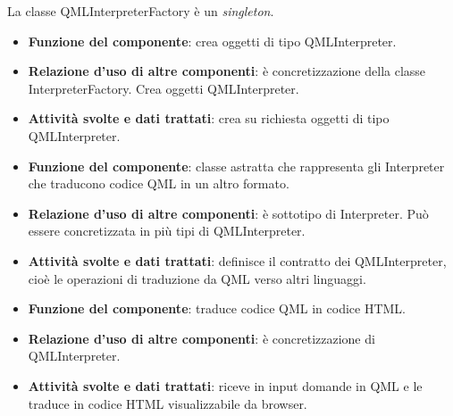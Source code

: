 La classe QMLInterpreterFactory è un \emph{singleton}.
\begin{itemize}
	\item\textbf{Funzione del componente}: crea oggetti di tipo QMLInterpreter.
	\item\textbf{Relazione d'uso di altre componenti}: è concretizzazione della classe InterpreterFactory. Crea oggetti QMLInterpreter.
	\item\textbf{Attività svolte e dati trattati}: crea su richiesta oggetti di tipo QMLInterpreter.
\end{itemize}
\begin{itemize}
	\item\textbf{Funzione del componente}: classe astratta che rappresenta gli Interpreter che traducono codice QML in un altro formato.
	\item\textbf{Relazione d'uso di altre componenti}: è sottotipo di Interpreter. Può essere concretizzata in più tipi di QMLInterpreter.
	\item\textbf{Attività svolte e dati trattati}: definisce il contratto dei QMLInterpreter, cioè le operazioni di traduzione da QML verso altri linguaggi.
\end{itemize}
\begin{itemize}
	\item\textbf{Funzione del componente}: traduce codice QML in codice HTML.
	\item\textbf{Relazione d'uso di altre componenti}: è concretizzazione di QMLInterpreter.
	\item\textbf{Attività svolte e dati trattati}: riceve in input domande in QML e le traduce in codice HTML visualizzabile da browser.
\end{itemize}

